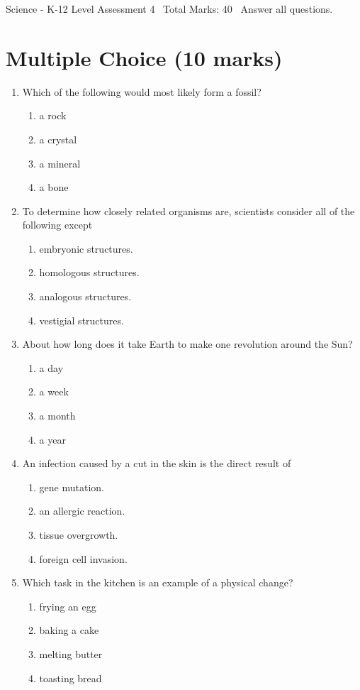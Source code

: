\documentclass[12pt]{article}
\begin{document}
\begin{center}
Science - K-12 Level Assessment 4 \
Total Marks: 40 \
Answer all questions.
\end{center}

\section*{Multiple Choice (10 marks)}
\begin{enumerate}[label=\arabic*.]
\item Which of the following would most likely form a fossil?
\begin{enumerate}[label=(\alph*)]
    \item a rock
    \item a crystal
    \item a mineral
    \item a bone
\end{enumerate}
\item To determine how closely related organisms are, scientists consider all of the following
except
\begin{enumerate}[label=(\alph*)]
    \item embryonic structures.
    \item homologous structures.
    \item analogous structures.
    \item vestigial structures.
\end{enumerate}
\item About how long does it take Earth to make one revolution around the Sun?
\begin{enumerate}[label=(\alph*)]
    \item a day
    \item a week
    \item a month
    \item a year
\end{enumerate}
\item An infection caused by a cut in the skin is the direct result of
\begin{enumerate}[label=(\alph*)]
    \item gene mutation.
    \item an allergic reaction.
    \item tissue overgrowth.
    \item foreign cell invasion.
\end{enumerate}
\item Which task in the kitchen is an example of a physical change?
\begin{enumerate}[label=(\alph*)]
    \item frying an egg
    \item baking a cake
    \item melting butter
    \item toasting bread
\end{enumerate}
\end{enumerate}
\end{document}
